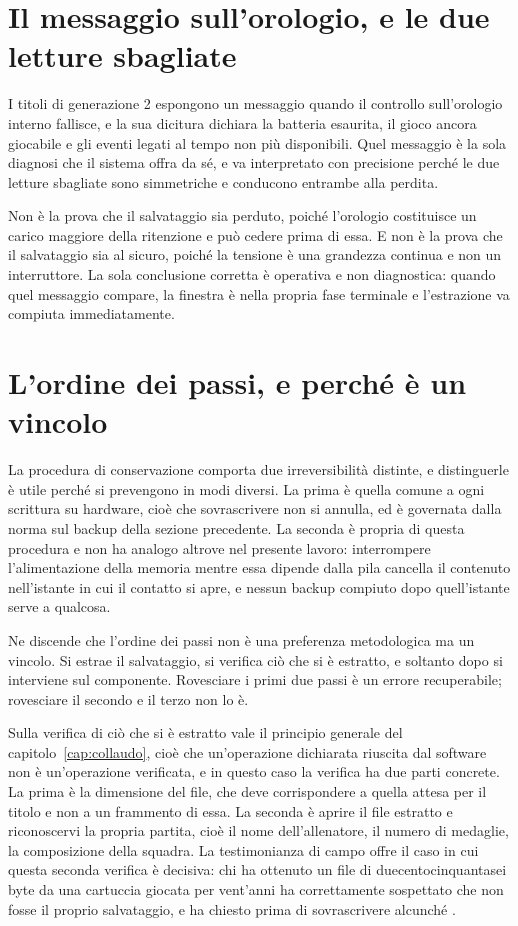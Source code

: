 \section{Il messaggio sull'orologio, e le due letture sbagliate}

I titoli di generazione 2 espongono un messaggio quando il controllo sull'orologio interno fallisce, e la sua dicitura dichiara la batteria esaurita, il gioco ancora giocabile e gli eventi legati al tempo non più disponibili. Quel messaggio è la sola diagnosi che il sistema offra da sé, e va interpretato con precisione perché le due letture sbagliate sono simmetriche e conducono entrambe alla perdita.

Non è la prova che il salvataggio sia perduto, poiché l'orologio costituisce un carico maggiore della ritenzione e può cedere prima di essa. E non è la prova che il salvataggio sia al sicuro, poiché la tensione è una grandezza continua e non un interruttore. La sola conclusione corretta è operativa e non diagnostica: quando quel messaggio compare, la finestra è nella propria fase terminale e l'estrazione va compiuta immediatamente.

\section{L'ordine dei passi, e perché è un vincolo}

La procedura di conservazione comporta due irreversibilità distinte, e distinguerle è utile perché si prevengono in modi diversi. La prima è quella comune a ogni scrittura su hardware, cioè che sovrascrivere non si annulla, ed è governata dalla norma sul backup della sezione precedente. La seconda è propria di questa procedura e non ha analogo altrove nel presente lavoro: interrompere l'alimentazione della memoria mentre essa dipende dalla pila cancella il contenuto nell'istante in cui il contatto si apre, e nessun backup compiuto dopo quell'istante serve a qualcosa.

Ne discende che l'ordine dei passi non è una preferenza metodologica ma un vincolo. Si estrae il salvataggio, si verifica ciò che si è estratto, e soltanto dopo si interviene sul componente. Rovesciare i primi due passi è un errore recuperabile; rovesciare il secondo e il terzo non lo è.

Sulla verifica di ciò che si è estratto vale il principio generale del capitolo~\ref{cap:collaudo}, cioè che un'operazione dichiarata riuscita dal software non è un'operazione verificata, e in questo caso la verifica ha due parti concrete. La prima è la dimensione del file, che deve corrispondere a quella attesa per il titolo e non a un frammento di essa. La seconda è aprire il file estratto e riconoscervi la propria partita, cioè il nome dell'allenatore, il numero di medaglie, la composizione della squadra. La testimonianza di campo offre il caso in cui questa seconda verifica è decisiva: chi ha ottenuto un file di duecentocinquantasei byte da una cartuccia giocata per vent'anni ha correttamente sospettato che non fosse il proprio salvataggio, e ha chiesto prima di sovrascrivere alcunché \cite{insidegadgets-canale}.

